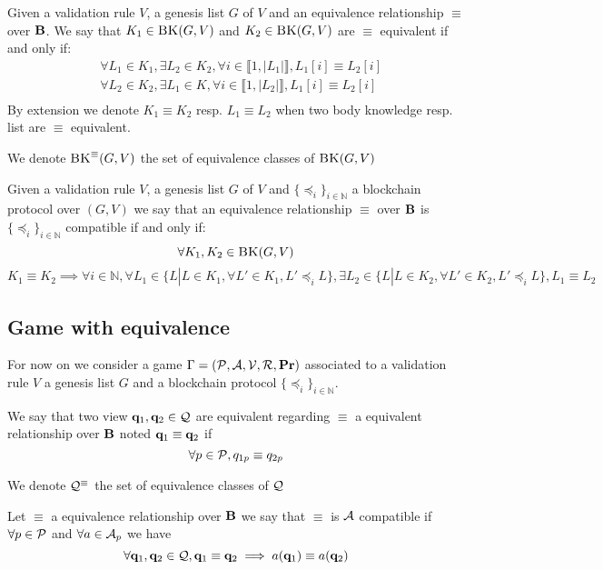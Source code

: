 \begin{mydef}
	Given a validation rule $V$, a genesis list $G$ of $V$ and an equivalence relationship $\equiv$ over $\text{\bf B}$. We say that $K_1 \in \text{\sc BK}(G,V)$ and $K_2 \in \text{\sc BK}(G,V)$ are $\equiv$ equivalent if and only if:
	\begin{eqnarray*}
		& \forall L_1 \in K_1, \exists L_2 \in K_2, \forall i \in \llbracket 1,|L_1| \rrbracket, L_1[i] \equiv L_2[i] \\
		& \forall L_2 \in K_2, \exists L_1 \in K, \forall i \in \llbracket 1,|L_2| \rrbracket, L_1[i] \equiv L_2[i] \\
	\end{eqnarray*}	
	By extension we denote $K_1 \equiv K_2$ resp. $L_1 \equiv L_2$ when two body knowledge resp. list are $\equiv$ equivalent.
\end{mydef}
We denote $\text{\sc BK}^\equiv(G,V)$ the set of equivalence classes of $\text{\sc BK}(G,V)$


\begin{mydef}
	Given a validation rule $V$, a genesis list $G$ of $V$ and $\{ \preceq_i\}_{i \in \mathbb{N}}$ a blockchain protocol over $(G,V)$ we say that an equivalence relationship $\equiv$ over $\text{\bf B}$ is $\{ \preceq_i\}_{i \in \mathbb{N}}$ compatible if and only if:
	$$\forall K_1 , K_2 \in \text{\sc BK}(G,V)$$
	$$K_1 \equiv K_2 \implies \forall i \in \mathbb{N}, \forall L_1 \in \{L | L \in K_1, \forall L' \in K_1, L' \preceq_i L \}, \exists L_2 \in \{L | L \in K_2, \forall L' \in K_2, L' \preceq_i L \}, L_1 \equiv L_2$$
\end{mydef}


\subsection{Game with equivalence}

For now on we consider a game $\Gamma = (\mathcal{P},\mathcal{A},\mathcal{V},\mathcal{R},\mathbf{Pr})$ associated to  a validation rule $V$ a genesis list $G$ and a blockchain protocol $\{ \preceq_i\}_{i \in \mathbb{N}}$. 

We say that two view $\mathbf{q}_1, \mathbf{q}_2 \in \mathcal{Q}$ are equivalent regarding $\equiv$ a equivalent relationship over $\text{\bf B}$ noted $\mathbf{q}_1\equiv \mathbf{q}_2$ if $$\forall p \in \mathcal{P}, q_{1p} \equiv q_{2p}$$

We denote $\mathcal{Q}^\equiv$ the set of equivalence classes of $\mathcal{Q}$

\begin{mydef}
	Let $\equiv$ a equivalence relationship over $\text{\bf B}$ we say that $\equiv$ is $\mathcal{A}$ compatible if $\forall p \in \mathcal{P}$ and $\forall a \in \mathcal{A}_p$ we have $$\forall \mathbf{q}_1,\mathbf{q}_2 \in \mathcal{Q}, \mathbf{q}_1 \equiv \mathbf{q}_2 \implies a(\mathbf{q}_1) \equiv a(\mathbf{q}_2 )$$
\end{mydef}


